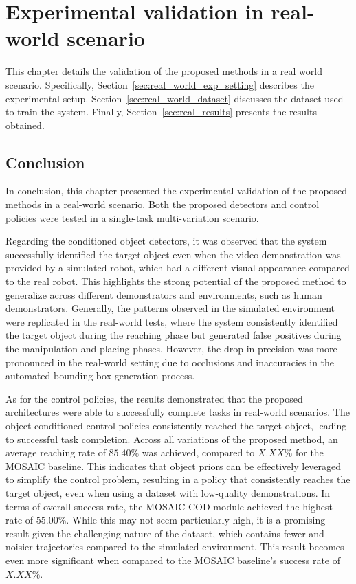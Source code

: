 \chapter{Experimental validation in real-world scenario}
\label{ch:real_world_application}
This chapter details the validation of the proposed methods in a real world scenario. Specifically, Section~\ref{sec:real_world_exp_setting} describes the experimental setup. Section~\ref{sec:real_world_dataset} discusses the dataset used to train the system. Finally, Section~\ref{sec:real_results} presents the results obtained.





\section{Conclusion}
In conclusion, this chapter presented the experimental validation of the proposed methods in a real-world scenario. Both the proposed detectors and control policies were tested in a single-task multi-variation scenario.

Regarding the conditioned object detectors, it was observed that the system successfully identified the target object even when the video demonstration was provided by a simulated robot, which had a different visual appearance compared to the real robot. This highlights the strong potential of the proposed method to generalize across different demonstrators and environments, such as human demonstrators. Generally, the patterns observed in the simulated environment were replicated in the real-world tests, where the system consistently identified the target object during the reaching phase but generated false positives during the manipulation and placing phases. However, the drop in precision was more pronounced in the real-world setting due to occlusions and inaccuracies in the automated bounding box generation process.

As for the control policies, the results demonstrated that the proposed architectures were able to successfully complete tasks in real-world scenarios. The object-conditioned control policies consistently reached the target object, leading to successful task completion. Across all variations of the proposed method, an average reaching rate of $85.40\%$ was achieved, compared to $X.XX\%$ for the MOSAIC baseline. This indicates that object priors can be effectively leveraged to simplify the control problem, resulting in a policy that consistently reaches the target object, even when using a dataset with low-quality demonstrations. In terms of overall success rate, the MOSAIC-COD module achieved the highest rate of $55.00\%$. While this may not seem particularly high, it is a promising result given the challenging nature of the dataset, which contains fewer and noisier trajectories compared to the simulated environment. This result becomes even more significant when compared to the MOSAIC baseline's success rate of $X.XX\%$.

